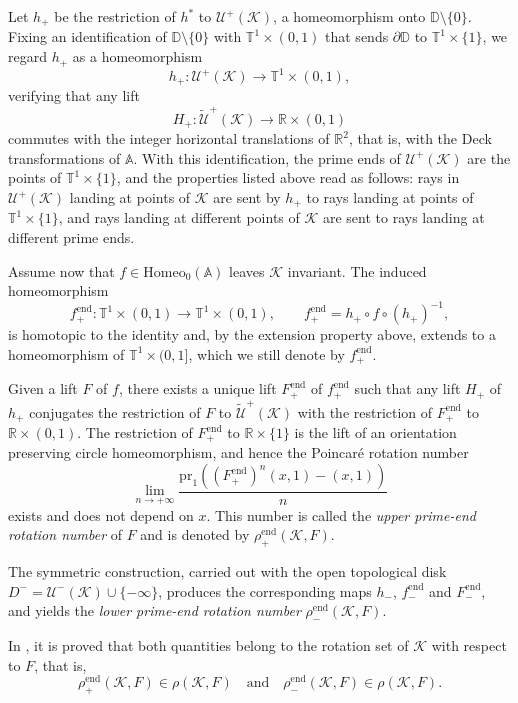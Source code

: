\documentclass[12pt,a4paper]{amsart}
\theoremstyle{definition}
\theoremstyle{remark}
\newcommand{\D}{\mathbb{D}}
\newcommand{\T}{\mathbb{T}}
\newcommand{\R}{\mathbb{R}}
\newcommand{\homeo}{\mathrm{Homeo}_0(\A)}
\newcommand{\A}{\mathbb{A}}
\begin{document}
{Let $h_+$ be the restriction of $h^*$ to $\mathcal{U}^{+}(\mathcal{K})$, a homeomorphism onto $\D\setminus\{0\}$. Fixing an identification of $\D\setminus\{0\}$ with $\T^1\times(0,1)$ that sends $\partial\D$ to $\T^1\times\{1\}$, we regard $h_+$ as a homeomorphism
$$h_+:\mathcal{U}^{+}(\mathcal{K})\to\T^1\times(0,1),$$
verifying that any lift
$$H_+:\widetilde{\mathcal{U}}^{+}(\mathcal{K})\to \R\times (0,1)$$
commutes with the integer horizontal translations of $\R^2$, that is, with the Deck transformations of $\A$. With this identification, the prime ends of $\mathcal{U}^{+}(\mathcal{K})$ are the points of $\T^1\times\{1\}$, and the properties listed above read as follows: rays in $\mathcal{U}^{+}(\mathcal{K})$ landing at points of $\mathcal{K}$ are sent by $h_+$ to rays landing at points of $\T^1\times\{1\}$, and rays landing at different points of $\mathcal{K}$ are sent to rays landing at different prime ends.
 
Assume now that $f\in\homeo$ leaves $\mathcal{K}$ invariant. The induced homeomorphism
$$f^{\mathrm{end}}_{+}:\T^1\times(0,1)\to \T^1\times(0,1), \qquad f^{\mathrm{end}}_{+}= h_+\circ f\circ (h_+)^{-1},$$
is homotopic to the identity and, by the extension property above, extends to a homeomorphism of $\T^1\times (0,1]$, which we still denote by $f^{\mathrm{end}}_{+}$.
 
Given a lift $F$ of $f$, there exists a unique lift $F^{\mathrm{end}}_{+}$ of $f^{\mathrm{end}}_{+}$ such that any lift $H_+$ of $h_+$ conjugates the restriction of $F$ to $\widetilde{\mathcal{U}}^{+}(\mathcal{K})$ with the restriction of $F^{\mathrm{end}}_{+}$ to $\R\times(0,1)$. The restriction of $F^{\mathrm{end}}_{+}$ to $\R\times\{1\}$ is the lift of an orientation preserving circle homeomorphism, and hence the Poincar\'e rotation number
$$\lim_{n\to +\infty}\frac{\mathrm{pr}_1\left(( F^{\mathrm{end}}_{+})^n(x,1)-(x,1)\right)}{n}$$
exists and does not depend on $x$. This number is called the \emph{upper prime-end rotation number} of $F$ and is denoted by $\rho^{\mathrm{end}}_{+}(\mathcal{K},F)$.
 
The symmetric construction, carried out with the open topological disk $D^-=\mathcal{U}^{-}(\mathcal{K})\cup\{-\infty\}$, produces the corresponding maps $h_-$, $f^{\mathrm{end}}_{-}$ and $F^{\mathrm{end}}_{-}$, and yields the \emph{lower prime-end rotation number} $\rho^{\mathrm{end}}_{-}(\mathcal{K},F)$.
}
 
In \cite{matsumoto,luishernandez}, it is proved that both quantities belong to the rotation set of $\mathcal{K}$ with respect to $F$, that is,
\[
\rho^{\mathrm{end}}_{+}(\mathcal{K},F) \in \rho(\mathcal{K},F) \quad\text{and}\quad \rho^{\mathrm{end}}_{-}(\mathcal{K},F) \in \rho(\mathcal{K},F).
\]
 
\end{document}
